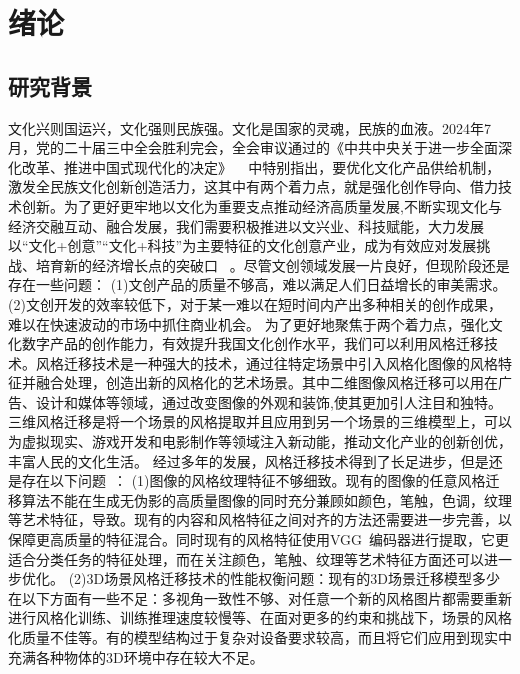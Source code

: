 \chapter{绪论}

\section{研究背景}
\indent
文化兴则国运兴，文化强则民族强。文化是国家的灵魂，民族的血液。2024年7月，党的二十届三中全会胜利完会，全会审议通过的《中共中央关于进一步全面深化改革、推进中国式现代化的决定》 ~\cite{xjptheory1} 中特别指出，要优化文化产品供给机制，激发全民族文化创新创造活力，这其中有两个着力点，就是强化创作导向、借力技术创新。为了更好更牢地以文化为重要支点推动经济高质量发展,不断实现文化与经济交融互动、融合发展，我们需要积极推进以文兴业、科技赋能，大力发展以“文化+创意”“文化+科技”为主要特征的文化创意产业，成为有效应对发展挑战、培育新的经济增长点的突破口~\cite{theory2} 。尽管文创领域发展一片良好，但现阶段还是存在一些问题：
\newline \indent
(1)文创产品的质量不够高，难以满足人们日益增长的审美需求。
\newline \indent
(2)文创开发的效率较低下，对于某一难以在短时间内产出多种相关的创作成果，难以在快速波动的市场中抓住商业机会。
\newline \indent
为了更好地聚焦于两个着力点，强化文化数字产品的创作能力，有效提升我国文化创作水平，我们可以利用风格迁移技术。风格迁移技术是一种强大的技术，通过往特定场景中引入风格化图像的风格特征并融合处理，创造出新的风格化的艺术场景。其中二维图像风格迁移可以用在广告、设计和媒体等领域，通过改变图像的外观和装饰,使其更加引人注目和独特。三维风格迁移是将一个场景的风格提取并且应用到另一个场景的三维模型上，可以为虚拟现实、游戏开发和电影制作等领域注入新动能，推动文化产业的创新创优，丰富人民的文化生活。
\newline \indent
经过多年的发展，风格迁移技术得到了长足进步，但是还是存在以下问题~\cite{jing2019neural}：
\newline \indent
(1)图像的风格纹理特征不够细致。现有的图像的任意风格迁移算法不能在生成无伪影的高质量图像的同时充分兼顾如颜色，笔触，色调，纹理等艺术特征，导致。现有的内容和风格特征之间对齐的方法还需要进一步完善，以保障更高质量的特征混合。同时现有的风格特征使用VGG~\cite{simonyan2014very}编码器进行提取，它更适合分类任务的特征处理，而在关注颜色，笔触、纹理等艺术特征方面还可以进一步优化。
\newline \indent
(2)3D场景风格迁移技术的性能权衡问题：现有的3D场景迁移模型多少在以下方面有一些不足：多视角一致性不够、对任意一个新的风格图片都需要重新进行风格化训练、训练推理速度较慢等、在面对更多的约束和挑战下，场景的风格化质量不佳等。有的模型结构过于复杂对设备要求较高，而且将它们应用到现实中充满各种物体的3D环境中存在较大不足。


